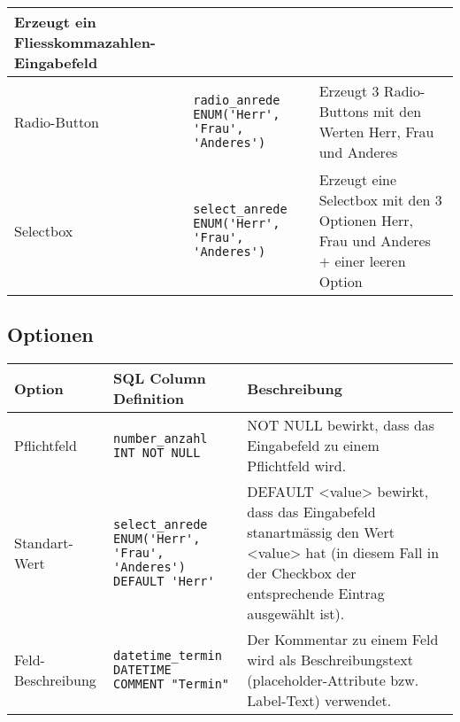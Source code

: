 \documentclass[11pt,a4paper,titlepage,portrait,ngerman]{scrartcl}
\begin{document}
{\begin{tabular}{|p{2cm}|l|p{5.2cm}|}
		{Erzeugt ein Fliesskommazahlen-Eingabefeld}  \\
	\hline
		{Radio-Button} 
		& 
		\begin{lstlisting} 
radio_anrede 
ENUM('Herr', 'Frau', 'Anderes')
		\end{lstlisting} 
		& 
		{Erzeugt 3 Radio-Buttons mit den Werten Herr, Frau und Anderes}  \\
	\hline
	{Selectbox} 
		& 
		\begin{lstlisting} 
select_anrede 
ENUM('Herr', 'Frau', 'Anderes')
		\end{lstlisting} 
		& 
		{Erzeugt eine Selectbox  mit den 3 Optionen Herr, Frau und Anderes $+$ einer leeren Option}  \\
	\hline
\end{tabular}


\subsection{Optionen}
\begin{tabular}{|p{2cm}|l|p{5.2cm}|} 
	\hline
		{\textbf{Option}} 
		& 
		{\textbf{SQL Column Definition}}
		& 
		{\textbf{Beschreibung}}  \\
	\hline
	{Pflichtfeld} 
		& 
		\begin{lstlisting} 
number_anzahl INT NOT NULL
		\end{lstlisting} 
		& 
		{NOT NULL bewirkt, dass das Eingabefeld zu einem Pflichtfeld wird.}  \\
	\hline
	{Standart-Wert} 
		& 
		\begin{lstlisting} 
select_anrede 
ENUM('Herr', 'Frau', 'Anderes')
DEFAULT 'Herr'
		\end{lstlisting} 
		& 
		{DEFAULT <value>  bewirkt, dass das Eingabefeld stanartmässig den Wert <value> hat (in diesem Fall in der Checkbox der entsprechende Eintrag ausgewählt ist).}  \\
	\hline
	{Feld-Beschreibung} 
		& 
		\begin{lstlisting} 
datetime_termin DATETIME 
COMMENT "Termin"
		\end{lstlisting} 
		& 
		{Der Kommentar zu einem Feld wird als Beschreibungstext (placeholder-Attribute bzw. Label-Text) verwendet.}  \\
	\hline
\end{tabular}
} 
 
\end{document}
